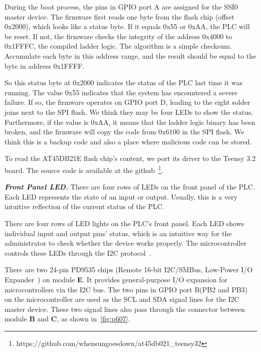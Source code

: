 During the boot process, the pins in GPIO port A are assigned for the SSI0 master device. The firmware first reads one byte from the flash chip (offset 0x2000), which looks like a status byte. If it equals 0x55 or 0xAA, the PLC will be reset. If not, the firmware checks the integrity of the address 0x4000 to 0x1FFFC, the compiled ladder logic. The algorithm is a simple checksum. Accumulate each byte in this address range, and the result should be equal to the byte in address 0x1FFFF.

So this status byte at 0x2000 indicates the status of the PLC last time it was running. The value 0x55 indicates that the system has encountered a severe failure. If so, the firmware operates on GPIO port D, leading to the eight solder joins next to the SPI flash. We think they may be four LEDs to show the status. Furthermore, if the value is 0xAA, it means that the ladder logic binary has been broken, and the firmware will copy the code from 0x6100 in the SPI flash. We think this is a backup code and also a place where malicious code can be stored.

To read the AT45DB21E flash chip's content, we port its driver to the Teensy 3.2 board. The source code is available at the github~\footnote{https://github.com/whensungoesdown/at45db021\_teensy32}.



\textbf{\textit{Front Panel LED.}} There are four rows of LEDs on the front panel of the PLC. Each LED represents the state of an input or output. Usually, this is a very intuitive reflection of the current status of the PLC.

There are four rows of LED lights on the PLC's front panel. Each LED shows individual input and output pins' status, which is an intuitive way for the administrator to check whether the device works properly. The microcontroller controls these LEDs through the I2C protocol~\cite{semiconductors2000i2c}.

There are two 24-pin PD9535 chips (Remote 16-bit I2C/SMBus, Low-Power I/O Expander~\cite{pd9535}) on module \textbf{E}. It provides general-purpose I/O expansion for microcontrollers via the I2C bus. The two pins in GPIO port B(PB2 and PB3) on the microcontroller are used as the SCL and SDA signal lines for the I2C master device. These two signal lines also pass through the connector between module \textbf{B} and \textbf{C}, as shown in~\autoref{fig:p607}.

